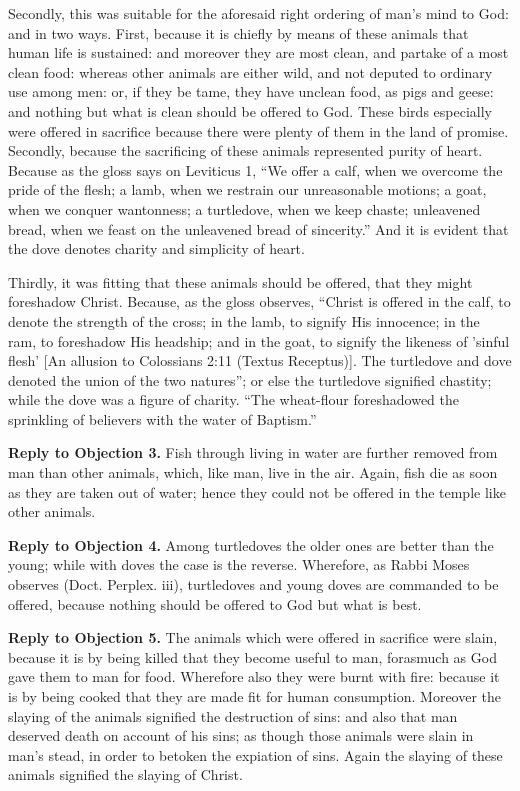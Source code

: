 Secondly, this was suitable for the aforesaid right ordering of man's mind to God: and in two ways. First, because it is chiefly by means of these animals that human life is sustained: and moreover they are most clean, and partake of a most clean food: whereas other animals are either wild, and not deputed to ordinary use among men: or, if they be tame, they have unclean food, as pigs and geese: and nothing but what is clean should be offered to God. These birds especially were offered in sacrifice because there were plenty of them in the land of promise. Secondly, because the sacrificing of these animals represented purity of heart. Because as the gloss says on Leviticus 1, ``We offer a calf, when we overcome the pride of the flesh; a lamb, when we restrain our unreasonable motions; a goat, when we conquer wantonness; a turtledove, when we keep chaste; unleavened bread, when we feast on the unleavened bread of sincerity.'' And it is evident that the dove denotes charity and simplicity of heart.

Thirdly, it was fitting that these animals should be offered, that they might foreshadow Christ. Because, as the gloss observes, ``Christ is offered in the calf, to denote the strength of the cross; in the lamb, to signify His innocence; in the ram, to foreshadow His headship; and in the goat, to signify the likeness of 'sinful flesh' [An allusion to Colossians 2:11 (Textus Receptus)]. The turtledove and dove denoted the union of the two natures''; or else the turtledove signified chastity; while the dove was a figure of charity. ``The wheat-flour foreshadowed the sprinkling of believers with the water of Baptism.''

\textbf{Reply to Objection 3.} Fish through living in water are further removed from man than other animals, which, like man, live in the air. Again, fish die as soon as they are taken out of water; hence they could not be offered in the temple like other animals.

\textbf{Reply to Objection 4.} Among turtledoves the older ones are better than the young; while with doves the case is the reverse. Wherefore, as Rabbi Moses observes (Doct. Perplex. iii), turtledoves and young doves are commanded to be offered, because nothing should be offered to God but what is best.

\textbf{Reply to Objection 5.} The animals which were offered in sacrifice were slain, because it is by being killed that they become useful to man, forasmuch as God gave them to man for food. Wherefore also they were burnt with fire: because it is by being cooked that they are made fit for human consumption. Moreover the slaying of the animals signified the destruction of sins: and also that man deserved death on account of his sins; as though those animals were slain in man's stead, in order to betoken the expiation of sins. Again the slaying of these animals signified the slaying of Christ.

